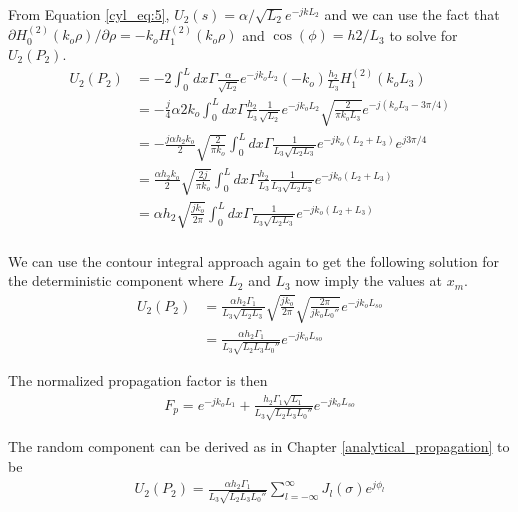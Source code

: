From Equation \ref{cyl_eq:5}, $U_2(s) = \alpha/\sqrt{L_2} e^{-jkL_2}$ and we can use the fact that $\partial H_0^{(2)}(k_o\rho)/\partial \rho = -k_oH_1^{(2)}(k_o\rho)$ and $\cos(\phi) = h2/L_3$ to solve for $U_2(P_2)$.
\begin{equation}
\begin{aligned}
U_2(P_2) &= -2\int_0^L dx \Gamma\frac{\alpha}{\sqrt{L_2}}e^{-jk_oL_2}(-k_o)\frac{h_2}{L_3}H_1^{(2)}(k_oL_3)\\
&= -\frac{j}{4}\alpha 2k_o\int_0^L dx \Gamma\frac{h_2}{L_3}\frac{1}{\sqrt{L_2}}e^{-jk_oL_2}\sqrt{\frac{2}{\pi k_o L_3}}e^{-j(k_oL_3-3\pi /4)}\\
&=-\frac{j\alpha h_2k_o }{2}\sqrt{\frac{2}{\pi k_o}}\int_0^L dx\Gamma \frac{1}{L_3\sqrt{L_2L_3}}e^{-jk_o(L_2+L_3)}e^{j3\pi/4}\\
&= \frac{\alpha h_2k_o}{2}\sqrt{\frac{2j}{\pi k_o}}\int_0^L dx\Gamma \frac{h_2}{L_3} \frac{1}{L_3\sqrt{L_2L_3}}e^{-jk_o(L_2+L_3)}\\
&= \alpha h_2\sqrt{\frac{j k_o}{2\pi}}\int_0^L dx \Gamma\frac{1}{L_3\sqrt{L_2L_3}}e^{-jk_o(L_2+L_3)}\\
\end{aligned}
\label{cyl_eq:7}
\end{equation}

We can use the contour integral approach again to get the following solution for the deterministic component where $L_2$ and $L_3$ now imply the values at $x_m$.
\begin{equation}
\begin{aligned}
U_2(P_2) &=\frac{\alpha h_2\Gamma_1}{L_3\sqrt{L_2L_3}}\sqrt{\frac{j k_o}{2\pi}}\sqrt{\frac{2\pi}{j k_oL_0''}}e^{-jk_oL_{so}}\\
&=\frac{\alpha h_2\Gamma_1}{L_3\sqrt{L_2L_3L_0''}}
e^{-jk_oL_{so} }\end{aligned}
\label{cyl_eq:8}
\end{equation}

\noindent The normalized propagation factor is then
\begin{equation}
\begin{aligned}
\boxed{F_p =e^{-jk_oL_1} + \frac{h_2\Gamma_1\sqrt{L_1}}{L_3\sqrt{L_2L_3L_0''}}e^{-jk_oL_{so} }}
\end{aligned}
\label{cyl_eq:9}
\end{equation}

\noindent The random component can be derived as in Chapter \ref{analytical_propagation} to be
\begin{equation}
\begin{aligned}
U_2(P_2) = \frac{\alpha h_2\Gamma_1}{L_3\sqrt{L_2L_3L_0''}}\sum_{l=-\infty}^{\infty}J_l(\sigma)e^{j\phi_l}
\label{cyl_eq:10}
\end{aligned}
\end{equation}
\renewcommand{\baselinestretch}{2} \small\normalsize

